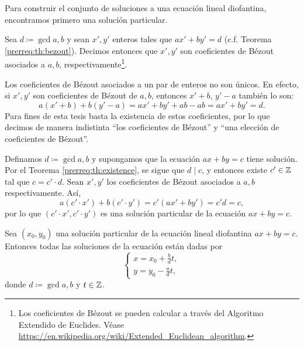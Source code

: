 Para construir el conjunto de soluciones a una ecuación lineal diofantina, encontramos primero una
solución particular.
\begin{definition}
	\label{prerreq:def:bezout}
	Sea $d \coloneq \gcd{a, b}$ y sean $x', y'$ enteros tales que $ax' + by' = d$ (c.f. Teorema
	\ref{prerreq:th:bezout}). Decimos entonces que $x', y'$ son coeficientes de Bézout asociados a
	$a, b$, respectivamente\footnote{
		Los coeficientes de Bézout se pueden calcular a través del Algoritmo Extendido de Euclides.
		Véase \url{https://en.wikipedia.org/wiki/Extended_Euclidean_algorithm}.
	}.
\end{definition}

\begin{observation}
	Los coeficientes de Bézout asociados a un par de enteros no son únicos. En efecto, si $x', y'$
	son coeficientes de Bézout de $a, b$, entonces $x' + b$, $y' - a$ también lo son:
	\begin{equation*}
		a(x' + b) + b(y' - a) = ax' + by' + ab - ab = ax' + by' = d.
	\end{equation*}
	Para fines de esta tesis basta la existencia de estos coeficientes, por lo que decimos de manera
	indistinta ``los coeficientes de Bézout'' y ``una elección de coeficientes de Bézout''.
\end{observation}

Definamos $d \coloneq \gcd{a, b}$ y supongamos que la ecuación $ax + by = c$ tiene solución.
Por el Teorema \ref{prerreq:th:existence}, se sigue que $d \mid c$, y entonces existe $c' \in \mathbb{Z}$
tal que $c = c' \cdot d$. Sean $x', y'$ los coeficientes de Bézout asociados a $a, b$
respectivamente. Así,
\begin{equation*}
	a(c' \cdot x') + b(c' \cdot y') = c'(ax' + by') = c'd = c,
\end{equation*}
por lo que $(c' \cdot x', c' \cdot y')$ es una solución particular de la ecuación $ax + by = c$.

\begin{theorem}[Construcción]
	\label{prerreq:th:construction}
	Sea $(x_0, y_0)$ una solución particular de la ecuación lineal diofantina $ax + by = c$.
	Entonces todas las soluciones de la ecuación están dadas por
	\begin{equation}
		\label{prerreq:eq:construction}
		\begin{cases}
			x = x_0 + \frac{b}{d}t, \\
			y = y_0 - \frac{a}{d}t,
		\end{cases}
	\end{equation}
	donde $d \coloneq \gcd{a, b}$ y $t \in \mathbb{Z}$.
\end{theorem}

